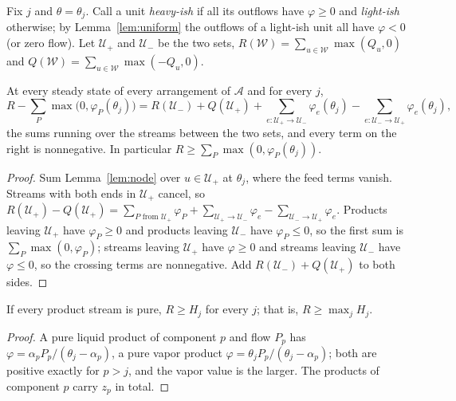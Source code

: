 Fix $j$ and $\theta=\theta_j$. Call a unit \emph{heavy-ish} if all its outflows have $\varphi\ge0$ and \emph{light-ish}
otherwise; by Lemma~\ref{lem:uniform} the outflows of a light-ish unit all have $\varphi<0$ (or zero flow). Let
$\mathcal U_+$ and $\mathcal U_-$ be the two sets, $R(\mathcal W)=\sum_{u\in\mathcal W}\max(Q_u,0)$ and
$Q(\mathcal W)=\sum_{u\in\mathcal W}\max(-Q_u,0)$.

\begin{theorem}\label{thm:stage}
At every steady state of every arrangement of $\mathcal A$ and for every $j$,
\begin{equation}\label{eq:defect}
R-\sum_P\max\bigl(0,\varphi_P(\theta_j)\bigr)=R(\mathcal U_-)+Q(\mathcal U_+)+\sum_{e\colon\mathcal U_+\to\mathcal U_-}\varphi_e(\theta_j)
-\sum_{e\colon\mathcal U_-\to\mathcal U_+}\varphi_e(\theta_j),
\end{equation}
the sums running over the streams between the two sets, and every term on the right is nonnegative. In particular
$R\ge\sum_P\max(0,\varphi_P(\theta_j))$.
\end{theorem}
\begin{proof}
Sum Lemma~\ref{lem:node} over $u\in\mathcal U_+$ at $\theta_j$, where the feed terms vanish. Streams with both ends in
$\mathcal U_+$ cancel, so
$R(\mathcal U_+)-Q(\mathcal U_+)=\sum_{P\text{ from }\mathcal U_+}\varphi_P+\sum_{\mathcal U_+\to\mathcal U_-}\varphi_e-\sum_{\mathcal U_-\to\mathcal U_+}\varphi_e$.
Products leaving $\mathcal U_+$ have $\varphi_P\ge0$ and products leaving $\mathcal U_-$ have $\varphi_P\le0$, so the first sum is
$\sum_P\max(0,\varphi_P)$; streams leaving $\mathcal U_+$ have $\varphi\ge0$ and streams leaving $\mathcal U_-$ have $\varphi\le0$, so the
crossing terms are nonnegative. Add $R(\mathcal U_-)+Q(\mathcal U_+)$ to both sides.
\end{proof}

\begin{corollary}\label{cor:pure}
If every product stream is pure, $R\ge H_j$ for every $j$; that is, $R\ge\max_jH_j$.
\end{corollary}
\begin{proof}
A pure liquid product of component $p$ and flow $P_p$ has $\varphi=\alpha_pP_p/(\theta_j-\alpha_p)$, a pure vapor product
$\varphi=\theta_jP_p/(\theta_j-\alpha_p)$; both are positive exactly for $p>j$, and the vapor value is the larger. The products
of component $p$ carry $z_p$ in total.
\end{proof}

